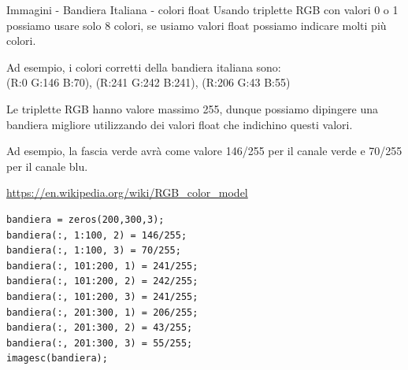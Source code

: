 \documentclass[aspectratio=169, handout]{beamer}
\begin{document}
\begin{frame}{Immagini - Bandiera Italiana - colori float}
Usando triplette RGB con valori 0 o 1 possiamo usare solo 8 colori, se usiamo valori float possiamo indicare molti più colori.

Ad esempio, i colori corretti della bandiera italiana sono:\\
(R:0 G:146 B:70), (R:241 G:242 B:241), (R:206 G:43 B:55)

Le triplette RGB hanno valore massimo 255, dunque possiamo dipingere una bandiera migliore utilizzando dei valori float che indichino questi valori.

Ad esempio, la fascia verde avrà come valore 146/255 per il canale verde e 70/255 per il canale blu.

\url{https://en.wikipedia.org/wiki/RGB_color_model}

\pause

\begin{lstlisting}[style=matlab]
bandiera = zeros(200,300,3);
bandiera(:, 1:100, 2) = 146/255;
bandiera(:, 1:100, 3) = 70/255;
bandiera(:, 101:200, 1) = 241/255;
bandiera(:, 101:200, 2) = 242/255;
bandiera(:, 101:200, 3) = 241/255;
bandiera(:, 201:300, 1) = 206/255;
bandiera(:, 201:300, 2) = 43/255;
bandiera(:, 201:300, 3) = 55/255;
imagesc(bandiera);
\end{lstlisting}
\end{frame}
\end{document}
